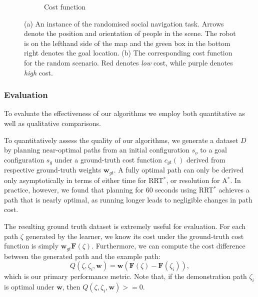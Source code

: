 \documentclass[a4paper,11pt]{report}
\begin{document}
\begin{figure}[tbh]
\begin{subfigure}[b]{0.435\columnwidth}
    \caption{Cost function}
    \label{fig:cost_f}
  \end{subfigure} 

  \caption[An instance of the randomised social navigation task, and its cost function.]{(a) An instance of the randomised social navigation task. Arrows denote the position and orientation of people in the scene. The robot is on the lefthand side of the map and the green box in the bottom right denotes the goal location. (b) The corresponding cost function for the random scenario. Red denotes \emph{low} cost, while purple denotes \emph{high} cost.}

  \label{fig:setting}
  \end{figure}


	\subsubsection{Evaluation}

	To evaluate the effectiveness of our algorithms we employ both quantitative as well as qualitative comparisons.

	To quantitatively assess the quality of our algorithms, we generate a dataset $D$ by planning near-optimal paths from an initial configuration $s_o$ to a goal configuration $s_g$ under a ground-truth cost function $c_{gt}()$ derived from respective ground-truth weights $\mathbf{w}_{gt}$. A fully optimal path can only be derived only asymptotically in terms of either time  for RRT$^*$, or resolution for A$^*$. In practice, however, we found that planning for 60 seconds using  RRT$^*$  achieves a path that is nearly optimal, as running longer leads to negligible changes in path cost. 

	The resulting ground truth dataset is extremely useful for evaluation. For each path $\zeta$ generated by the learner, we know its cost under the ground-truth cost function is simply  $\mathbf{w}_{gt}\mathbf{F}(\zeta)$. Furthermore, we can compute the cost difference between the generated path and the example path:
	\begin{equation}
		Q(\zeta,\zeta_i,\mathbf{w}) = \mathbf{w}(\mathbf{F}(\zeta)-\mathbf{F}(\zeta_i)), \label{eq:obj_eval}
	\end{equation}
which is our primary performance metric.  Note that, if the demonstration path $\zeta_i$ is optimal under $\mathbf{w}$, then $Q(\zeta,\zeta_i,\mathbf{w})>=0$.
\end{document}
